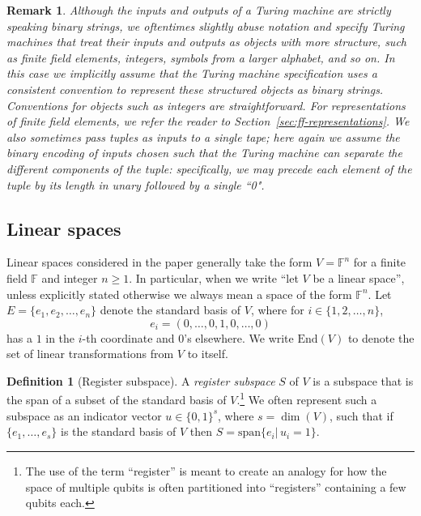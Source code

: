\documentclass[11pt]{article}
\newtheorem{remark}[theorem]{Remark}
\theoremstyle{definition}
\newtheorem{definition}[theorem]{Definition}
\newcommand{\F}{\ensuremath{\mathbb{F}}}
\newcommand{\End}{\mathrm{End}}
\begin{document}
\begin{remark}
  \label{rmk:tm-representations}
  Although the inputs and outputs of a Turing machine are strictly speaking
  binary strings, we oftentimes slightly abuse notation and specify Turing
  machines that treat their inputs and outputs as objects with more structure,
  such as finite field elements, integers, symbols from a larger alphabet, and
  so on.
  In this case we implicitly assume that the Turing machine specification uses a
  consistent convention to represent these structured objects as binary strings.
  Conventions for objects such as integers are straightforward.
  For representations of finite field elements, we refer the reader to
  Section~\ref{sec:ff-representations}.
  We also sometimes pass tuples as inputs to a single tape; here again we assume
  the binary encoding of inputs chosen such that the Turing machine can separate
  the different components of the tuple: specifically, we may precede each
  element of the tuple by its length in unary followed by a single ``0".
\end{remark}

\subsection{Linear spaces}
\label{sec:linear-spaces}

Linear spaces considered in the paper generally take the form $V = \F^n$ for a
finite field $\F$ and integer $n \geq 1$.
In particular, when we write ``let $V$ be a linear space'', unless explicitly
stated otherwise we always mean a space of the form $\F^n$.
Let $E = \{ e_1, e_2, \ldots, e_n\}$ denote the standard basis of $V$, where for
$i \in\{ 1, 2, \ldots, n\}$,
\begin{equation*}
  e_i = (0, \ldots, 0, 1, 0, \ldots, 0)
\end{equation*}
has a $1$ in the $i$-th coordinate and $0$'s elsewhere.
We write $\End(V)$ to denote the set of linear transformations from $V$ to
itself.

\begin{definition}[Register subspace]
  A \emph{register subspace} $S$ of $V$ is a subspace that is the span of a
  subset of the standard basis of $V$.\footnote{The use of the term ``register''
    is meant to create an analogy for how the space of multiple qubits is often
    partitioned into ``registers'' containing a few qubits each.}
  We often represent such a subspace as an indicator vector $u\in \{0,1\}^s$,
  where $s=\dim(V)$, such that if $\{e_1,\ldots,e_s\}$ is the standard basis of
  $V$ then $S = \text{span}\{e_i|\,u_i=1\}$.
\end{definition}
\end{document}
